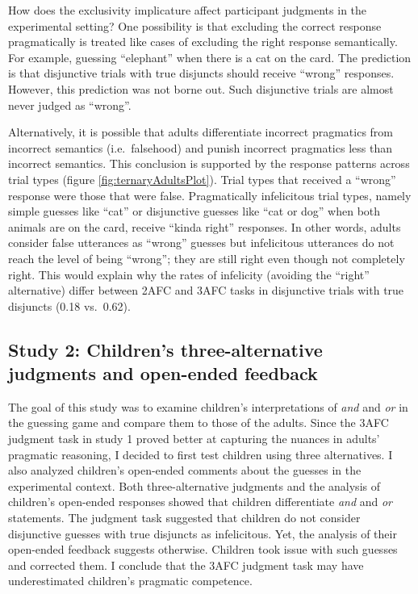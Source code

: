 \documentclass[man]{apa6}
\theoremstyle{definition}
\theoremstyle{definition}
\theoremstyle{definition}
\theoremstyle{remark}
\begin{document}
How does the exclusivity implicature affect participant judgments in the
experimental setting? One possibility is that excluding the correct
response pragmatically is treated like cases of excluding the right
response semantically. For example, guessing \enquote{elephant} when
there is a cat on the card. The prediction is that disjunctive trials
with true disjuncts should receive \enquote{wrong} responses. However,
this prediction was not borne out. Such disjunctive trials are almost
never judged as \enquote{wrong}.

Alternatively, it is possible that adults differentiate incorrect
pragmatics from incorrect semantics (i.e.~falsehood) and punish
incorrect pragmatics less than incorrect semantics. This conclusion is
supported by the response patterns across trial types (figure
\ref{fig:ternaryAdultsPlot}). Trial types that received a
\enquote{wrong} response were those that were false. Pragmatically
infelicitous trial types, namely simple guesses like \enquote{cat} or
disjunctive guesses like \enquote{cat or dog} when both animals are on
the card, receive \enquote{kinda right} responses. In other words,
adults consider false utterances as \enquote{wrong} guesses but
infelicitous utterances do not reach the level of being \enquote{wrong};
they are still right even though not completely right. This would
explain why the rates of infelicity (avoiding the \enquote{right}
alternative) differ between 2AFC and 3AFC tasks in disjunctive trials
with true disjuncts (0.18 vs.~0.62).

\subsection{Study 2: Children's three-alternative judgments and
open-ended
feedback}\label{study-2-childrens-three-alternative-judgments-and-open-ended-feedback}

The goal of this study was to examine children's interpretations of
\emph{and} and \emph{or} in the guessing game and compare them to those
of the adults. Since the 3AFC judgment task in study 1 proved better at
capturing the nuances in adults' pragmatic reasoning, I decided to first
test children using three alternatives. I also analyzed children's
open-ended comments about the guesses in the experimental context. Both
three-alternative judgments and the analysis of children's open-ended
responses showed that children differentiate \emph{and} and \emph{or}
statements. The judgment task suggested that children do not consider
disjunctive guesses with true disjuncts as infelicitous. Yet, the
analysis of their open-ended feedback suggests otherwise. Children took
issue with such guesses and corrected them. I conclude that the 3AFC
judgment task may have underestimated children's pragmatic competence.
\end{document}

